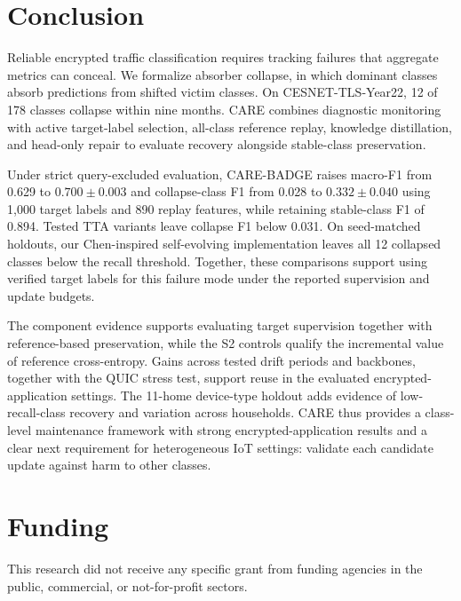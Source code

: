 \documentclass[journal]{IEEEtran}
\newcommand{\ours}{CARE}  %
\begin{document}
\section{Conclusion}
\label{sec:conclusion}

Reliable encrypted traffic classification requires tracking failures that aggregate metrics can conceal. We formalize absorber collapse, in which dominant classes absorb predictions from shifted victim classes. On CESNET-TLS-Year22, 12 of 178 classes collapse within nine months. \ours{} combines diagnostic monitoring with active target-label selection, all-class reference replay, knowledge distillation, and head-only repair to evaluate recovery alongside stable-class preservation.

Under strict query-excluded evaluation, \ours{}-BADGE raises macro-F1 from 0.629 to $0.700{\pm}0.003$ and collapse-class F1 from 0.028 to $0.332{\pm}0.040$ using 1{,}000 target labels and 890 replay features, while retaining stable-class F1 of 0.894. Tested TTA variants leave collapse F1 below 0.031. On seed-matched holdouts, our Chen-inspired self-evolving implementation leaves all 12 collapsed classes below the recall threshold. Together, these comparisons support using verified target labels for this failure mode under the reported supervision and update budgets.

The component evidence supports evaluating target supervision together with reference-based preservation, while the S2 controls qualify the incremental value of reference cross-entropy. Gains across tested drift periods and backbones, together with the QUIC stress test, support reuse in the evaluated encrypted-application settings. The 11-home device-type holdout adds evidence of low-recall-class recovery and variation across households. CARE thus provides a class-level maintenance framework with strong encrypted-application results and a clear next requirement for heterogeneous IoT settings: validate each candidate update against harm to other classes.

\section*{Funding}
This research did not receive any specific grant from funding agencies in the public, commercial, or not-for-profit sectors.
\end{document}
